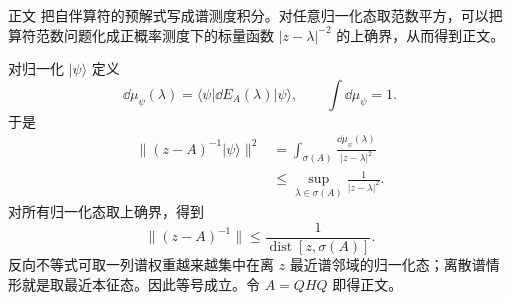 \begin{derivation}

正文 把自伴算符的预解式写成谱测度积分。对任意归一化态取范数平方，可以把算符范数问题化成正概率测度下的标量函数 $|z-\lambda|^{-2}$ 的上确界，从而得到正文。

对归一化 $|\psi\rangle$ 定义
\begin{equation*}
 \dd\mu_\psi(\lambda)
 =\langle\psi|\dd E_A(\lambda)|\psi\rangle,
 \qquad
 \int\dd\mu_\psi=1.
\end{equation*}
于是
\begin{align*}
 \|(z-A)^{-1}|\psi\rangle\|^2
 &=\int_{\sigma(A)}
 \frac{\dd\mu_\psi(\lambda)}{|z-\lambda|^2}\\
 &\le
 \sup_{\lambda\in\sigma(A)}\frac1{|z-\lambda|^2}.
\end{align*}
对所有归一化态取上确界，得到
\begin{equation*}
 \|(z-A)^{-1}\|
 \le\frac1{\operatorname{dist}[z,\sigma(A)]}.
\end{equation*}
反向不等式可取一列谱权重越来越集中在离 $z$ 最近谱邻域的归一化态；离散谱情形就是取最近本征态。因此等号成立。令 $A=QHQ$ 即得正文。
\end{derivation}

